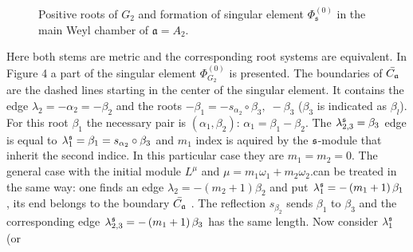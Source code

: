\documentclass[12pt]{article}
\begin{document}
 \begin{figure}[h!bt]
  \noindent{}
  \caption{Positive roots of $G_{2}$ and formation of singular element $\Phi^{(0)}_{\mathfrak{s}}$ in the main Weyl chamber of $\mathfrak{a}=A_{2}$.}
\end{figure}
Here both stems are metric and the corresponding root systems are
equivalent. In Figure 4 a part of the singular element $\Phi
_{G_{2}}^{\left( 0\right) }$ is presented. The boundaries of $\bar{C_{\frak{a%
}}}$ are the dashed lines starting in the center of the singular
element. It
contains the edge $\lambda _{2}=-\alpha _{2}=-\beta _{2}$ and the roots $%
-\beta _{1}=-s_{\alpha _{2}}\circ \beta _{3},\; -\beta _{3}$
($\beta _{3}$ is indicated as $\beta _{l}$). For this root $\beta
_{1}$ the necessary pair
is  $(\alpha _{1}, \beta _{2})$: $\alpha _{1}=\beta _{1}-\beta _{2}$. The $%
\lambda _{2,3}^{\frak{s}}=\beta _{3}$ edge is equal to $\lambda _{1}^{\frak{s%
}}=\beta _{1}=s_{\alpha _{2}}\circ \beta _{3}$ and $m_{1}$ index
is aquired by the $\frak{s}$-module that inherit the second
indice. In this particular
case they are $m_{1}=m_{2}=0$. The general case with the initial module $%
L^{\mu }$ and $\mu =m_{1}\omega _{1}+m_{2}\omega _{2}$.can be
treated in the same way: one finds an edge $\lambda _{2}=-\left(
m_{2}+1\right) \beta _{2}$ and put $\lambda
_{1}^{\frak{s}}=-\left( m_{1}+1\right) \beta _{1}$, its end
belongs to the boundary $\bar{C_{\frak{a}}}$ . The reflection
$s_{\beta
_{2}} $ sends $\beta _{1}$ to $\beta _{3}$ and the corresponding edge $%
\lambda _{2,3}^{\frak{s}}=-\left( m_{1}+1\right) \beta _{3}$ has
the same length. Now consider $\lambda _{1}^{\frak{s}}$ (or
\end{document}
